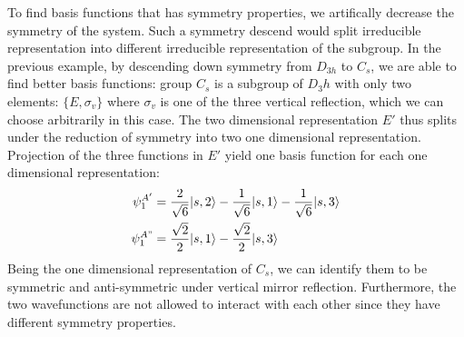 \documentclass{article}
\begin{document}
To find basis functions that has symmetry properties, we artifically decrease the symmetry of the system. 
Such a symmetry descend would split irreducible representation into different irreducible representation 
of the subgroup. 
In the previous example, by descending down symmetry from $D_{3h}$ to $C_s$, 
we are able to find better basis functions: group $C_s$ is a subgroup 
of $D_3h$ with only two elements: $\{E, \sigma_v\}$ where $\sigma_v$ is one of the three vertical reflection, 
which we can choose arbitrarily in this case. 
The two dimensional representation $E'$ thus splits under the reduction of symmetry into two one dimensional representation.
Projection of the three functions in $E'$ yield one basis function for each one dimensional representation:
\begin{align}
    \psi_1^{A'} &= \frac{2}{\sqrt{6}} |s,2\rangle - \frac{1}{\sqrt{6}} |s,1\rangle - \frac{1}{\sqrt{6}} |s,3\rangle \\
    \psi_1^{A"} &= \frac{\sqrt{2}}{2} |s,1\rangle - \frac{\sqrt{2}}{2} |s,3\rangle
\end{align}
Being the one dimensional representation of $C_s$, we can identify them to be 
symmetric and anti-symmetric under vertical mirror reflection. Furthermore, the two wavefunctions 
are not allowed to interact with each other since they have different symmetry properties.
\end{document}
